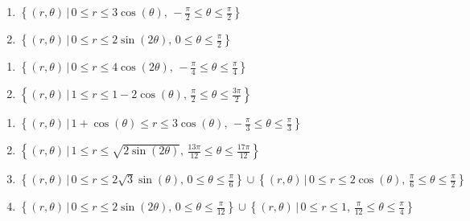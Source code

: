 \begin{multicols}{2} 

\begin{enumerate}

\setcounter{enumi}{\value{HW}}

\item $\left\{ (r,\theta) \, | \, 0 \leq r \leq 3\cos(\theta), \, -\frac{\pi}{2} \leq \theta \leq \frac{\pi}{2} \right\}$
\item $\left\{ (r,\theta) \, | \, 0 \leq r \leq 2\sin(2\theta), \,0 \leq \theta \leq \frac{\pi}{2} \right\}$

\setcounter{HW}{\value{enumi}}

\end{enumerate}

\end{multicols}

\begin{multicols}{2} 

\begin{enumerate}

\setcounter{enumi}{\value{HW}}

\item $\left\{ (r,\theta) \, | \, 0 \leq r \leq 4\cos(2\theta), \, -\frac{\pi}{4} \leq \theta \leq \frac{\pi}{4} \right\}$
\item $\left\{ (r,\theta) \, | \, 1 \leq r \leq 1-2\cos(\theta), \, \frac{\pi}{2} \leq \theta \leq \frac{3\pi}{2} \right\}$

\setcounter{HW}{\value{enumi}}

\end{enumerate}

\end{multicols}

\begin{enumerate}

\setcounter{enumi}{\value{HW}}

\item $\left\{ (r,\theta) \, | \, 1 + \cos(\theta) \leq r \leq 3\cos(\theta), \, -\frac{\pi}{3} \leq \theta \leq \frac{\pi}{3} \right\}$
\item $\left\{ (r,\theta) \, | \, 1 \leq r \leq \sqrt{2\sin(2\theta)}, \, \frac{13\pi}{12} \leq \theta \leq \frac{17\pi}{12} \right\}$
\item  $\left\{ (r,\theta) \, | \, 0 \leq r \leq 2\sqrt{3} \sin(\theta), \, 0 \leq \theta \leq \frac{\pi}{6} \right\} \cup \left\{ (r,\theta) \, | \, 0 \leq r \leq 2\cos(\theta), \, \frac{\pi}{6}  \leq \theta \leq \frac{\pi}{2} \right\}$
\item  $\left\{ (r,\theta) \, | \, 0 \leq r \leq 2 \sin(2\theta), \, 0 \leq \theta \leq \frac{\pi}{12} \right\} \cup \left\{ (r,\theta) \, | \, 0 \leq r \leq 1, \, \frac{\pi}{12}  \leq \theta \leq \frac{\pi}{4} \right\}$ \label{regionsketchlast}

\setcounter{HW}{\value{enumi}}

\end{enumerate}

